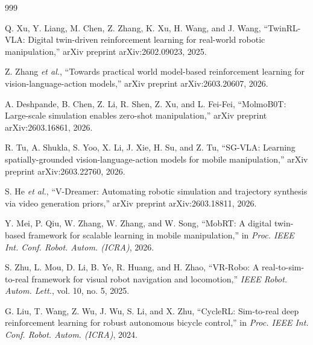 \documentclass[11pt,a4paper]{article}
\begin{document}
\begin{thebibliography}{999}

Q. Xu, Y. Liang, M. Chen, Z. Zhang, K. Xu, H. Wang, and J. Wang, ``{TwinRL-VLA}: Digital twin-driven reinforcement learning for real-world robotic manipulation,'' arXiv preprint arXiv:2602.09023, 2025.




Z. Zhang \textit{et al.}, ``Towards practical world model-based reinforcement learning for vision-language-action models,'' arXiv preprint arXiv:2603.20607, 2026.




A. Deshpande, B. Chen, Z. Li, R. Shen, Z. Xu, and L. Fei-Fei, ``{MolmoB0T}: Large-scale simulation enables zero-shot manipulation,'' arXiv preprint arXiv:2603.16861, 2026.




R. Tu, A. Shukla, S. Yoo, X. Li, J. Xie, H. Su, and Z. Tu, ``{SG-VLA}: Learning spatially-grounded vision-language-action models for mobile manipulation,'' arXiv preprint arXiv:2603.22760, 2026.




S. He \textit{et al.}, ``{V-Dreamer}: Automating robotic simulation and trajectory synthesis via video generation priors,'' arXiv preprint arXiv:2603.18811, 2026.




Y. Mei, P. Qiu, W. Zhang, W. Zhang, and W. Song, ``{MobRT}: A digital twin-based framework for scalable learning in mobile manipulation,'' in \textit{Proc. IEEE Int. Conf. Robot. Autom. (ICRA)}, 2026.




S. Zhu, L. Mou, D. Li, B. Ye, R. Huang, and H. Zhao, ``{VR-Robo}: A real-to-sim-to-real framework for visual robot navigation and locomotion,'' \textit{IEEE Robot. Autom. Lett.}, vol. 10, no. 5, 2025.




G. Liu, T. Wang, Z. Wu, J. Wu, S. Li, and X. Zhu, ``{CycleRL}: Sim-to-real deep reinforcement learning for robust autonomous bicycle control,'' in \textit{Proc. IEEE Int. Conf. Robot. Autom. (ICRA)}, 2024.




\end{thebibliography}
\end{document}

